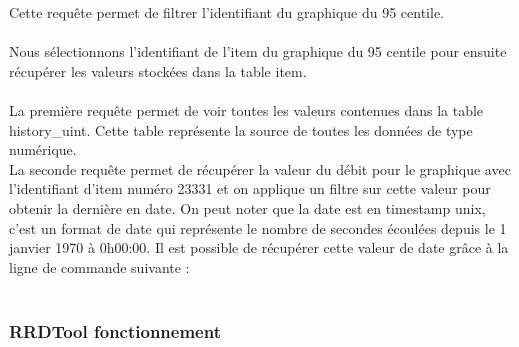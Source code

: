Cette requête permet de filtrer l'identifiant du graphique du 95 centile.\\

\\

Nous sélectionnons l'identifiant de l'item du graphique du 95 centile pour ensuite récupérer les valeurs stockées dans la table item.\\

\\

La première requête permet de voir toutes les valeurs contenues dans la table history\_uint. Cette table représente la source de toutes les données de type numérique.\\

La seconde requête permet de récupérer la valeur du débit pour le graphique avec l'identifiant d'item numéro 23331 et on applique un filtre sur cette valeur pour obtenir la dernière en date. On peut noter que la date est en timestamp unix, c'est un format de date qui représente le nombre de secondes écoulées depuis le 1 janvier 1970 à 0h00:00. Il est possible de récupérer cette valeur de date grâce à la ligne de commande suivante :\\

\\

		\subsubsection{RRDTool fonctionnement}
			\vspace{0.3cm}

